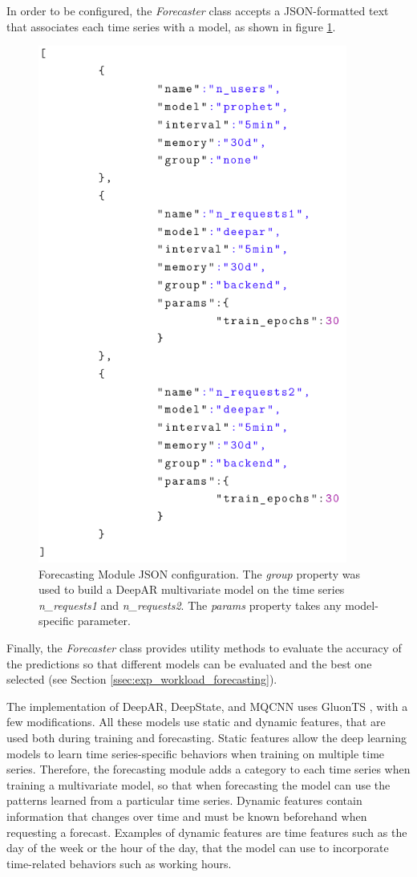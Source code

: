 \documentclass[a4paper, 12pt]{article} %
\begin{document}
	In order to be configured, the \textit{Forecaster} class accepts a JSON-formatted text that associates each time series with a model, as shown in figure \ref{fig:forecaster_cfg.png}.
	\begin{figure}[!b]\centering
		\includegraphics[width=4in]{img/forecaster_cfg.png}
		\caption{Forecasting Module JSON configuration. The \textit{group} property was used to build a DeepAR multivariate model on the time series \textit{n\_requests1} and \textit{n\_requests2}. The \textit{params} property takes any model-specific parameter.}
		\label{fig:forecaster_cfg.png}
	\end{figure}
	Finally, the \textit{Forecaster} class provides utility methods to evaluate the accuracy of the predictions so that different models can be evaluated and the best one selected (see Section \ref{ssec:exp_workload_forecasting}).
	
	The implementation of DeepAR, DeepState, and MQCNN uses GluonTS \cite{GluonTS}, with a few modifications. All these models use static and dynamic features, that are used both during training and forecasting. Static features allow the deep learning models to learn time series-specific behaviors when training on multiple time series. Therefore, the forecasting module adds a category to each time series when training a multivariate model, so that when forecasting the model can use the patterns learned from a particular time series. Dynamic features contain information that changes over time and must be known beforehand when requesting a forecast. Examples of dynamic features are time features such as the day of the week or the hour of the day, that the model can use to incorporate time-related behaviors such as working hours.
	
\end{document}
